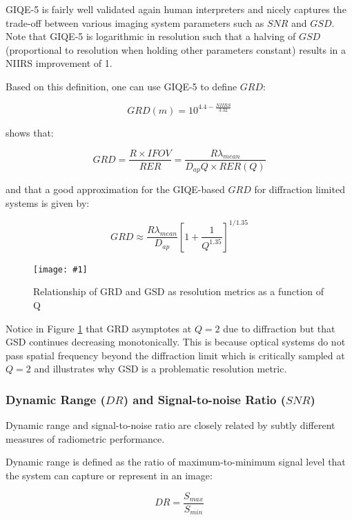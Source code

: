 \documentclass[10pt,journal]{IEEEtran}  %
\newcommand{\includefigure}[3]
{
  \begin{figure}[h!]
  \centering
  \texttt{[image: \#1]}
  \caption[]{#3}
  \label{#2}
  \end{figure}
}
\begin{document}
GIQE-5 is fairly well validated again human interpreters \cite{giqe5} and nicely captures the trade-off between various imaging system parameters such as $SNR$ and $GSD$.  Note that GIQE-5 is logarithmic in resolution such that a halving of $GSD$ (proportional to resolution when holding other parameters constant) results in a NIIRS improvement of 1.

Based on this definition, one can use GIQE-5 to define $GRD$:

\begin{equation}
    GRD(m) = 10^{4.4 - \frac{NIIRS}{3.32}}
\end{equation}

\cite{auelmann_iq} shows that:

\begin{equation}
    GRD = \frac{R\times IFOV}{RER} = \frac{R\lambda_{mean}}{D_{ap} Q \times RER (Q)}
\label{eq:alpha_eff}
\end{equation}

and that a good approximation for the GIQE-based $GRD$ for diffraction limited systems is given by:

\begin{equation}
    GRD \approx \frac{R\lambda_{mean}}{D_{ap}}\left[1 + \frac{1}{Q^{1.35}}\right]^{1/1.35}
\label{eq:alpha_eff_approx}
\end{equation}

\includefigure{figures/resolution_q.pgf}{fig:resolution_q}{Relationship of GRD and GSD as resolution metrics as a function of Q}

Notice in Figure \ref{fig:resolution_q} that GRD asymptotes at $Q=2$ due to diffraction but that GSD continues decreasing monotonically.  This is because optical systems do not pass spatial frequency beyond the diffraction limit which is critically sampled at $Q=2$ and illustrates why GSD is a problematic resolution metric.

\subsubsection{Dynamic Range ($DR$) and Signal-to-noise Ratio ($SNR$)}
Dynamic range and signal-to-noise ratio are closely related by subtly different measures of radiometric performance.

Dynamic range is defined as the ratio of maximum-to-minimum signal level that the system can capture or represent in an image:

$$DR = \frac{S_{max}}{S_{min}}$$
\end{document}
